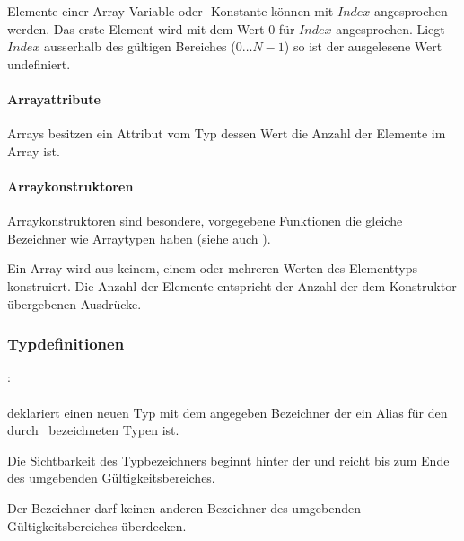 Elemente einer Array-Variable oder -Konstante können mit \ident{Bezeichner[}$\mathit{Index}$\ident{]} angesprochen
werden. Das erste Element wird mit dem Wert $0$ für $\mathit{Index}$ angesprochen.
Liegt $\mathit{Index}$ ausserhalb des gültigen Bereiches ($0\dots{}N-1$) so ist der ausgelesene Wert
undefiniert.


\paragraph{Arrayattribute}\label{Arrayattribute}

Arrays besitzen ein Attribut  vom Typ  dessen Wert
die Anzahl der Elemente im Array ist.


\paragraph{Arraykonstruktoren}\label{Arraykonstruktoren}


Arraykonstruktoren sind besondere, vorgegebene Funktionen die gleiche Bezeichner wie Arraytypen haben
(siehe auch ).

Ein Array wird aus keinem, einem oder mehreren Werten des Elementtyps konstruiert.
Die Anzahl der Elemente entspricht der Anzahl der dem Konstruktor übergebenen Ausdrücke.

\subsubsection{Typdefinitionen}\label{Typdefinitionen}
:\label{typ_definition}\\
\hspace*{1cm}\Gspace{} \Gspace{} \\

 deklariert einen neuen Typ mit dem angegeben Bezeichner der ein Alias für den durch \glq{}\grq\ bezeichneten Typen ist.

Die Sichtbarkeit des Typbezeichners beginnt hinter der 
und reicht bis zum Ende des umgebenden Gültigkeitsbereiches.

Der Bezeichner darf keinen anderen Bezeichner des umgebenden Gültigkeitsbereiches überdecken.


